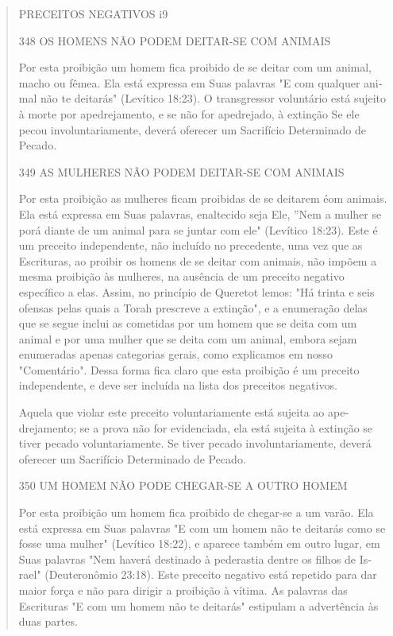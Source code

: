 \begin{quote}
PRECEITOS NEGATIVOS i9

348 OS HOMENS NÃO PODEM DEITAR-SE COM ANIMAIS

Por esta proibição um homem fica proibido de se deitar com um ani­mal,
macho ou fêmea. Ela está expressa em Suas palavras "E com qualquer
ani­mal não te deitarás" (Levítico 18:23). O transgressor voluntário
está sujeito à morte por apedrejamento, e se não for apedrejado, à
extinção Se ele pecou involuntariamente, deverá oferecer um Sacrifício
Determinado de Pecado.

349 AS MULHERES NÃO PODEM DEITAR-SE COM ANIMAIS

Por esta proibição as mulheres ficam proibidas de se deitarem éom
animais. Ela está expressa em Suas palavras, enaltecido seja Ele, ''Nem
a mulher se porá diante de um animal para se juntar com ele" (Levítico
18:23). Este é um preceito independente, não incluído no precedente, uma
vez que as Escri­turas, ao proibir os homens de se deitar com animais,
não impõem a mesma proibição às mulheres, na ausência de um preceito
negativo específico a elas. Assim, no princípio de Queretot lemos: "Há
trinta e seis ofensas pelas quais a Torah prescreve a extinção", e a
enumeração delas que se segue inclui as co­metidas por um homem que se
deita com um animal e por uma mulher que se deita com um animal, embora
sejam enumeradas apenas categorias gerais, como explicamos em nosso
"Comentário". Dessa forma fica claro que esta proi­bição é um preceito
independente, e deve ser incluída na lista dos preceitos negativos.

Aquela que violar este preceito voluntariamente está sujeita ao
ape­drejamento; se a prova não for evidenciada, ela está sujeita à
extinção se tiver pecado voluntariamente. Se tiver pecado
involuntariamente, deverá oferecer um Sacrifício Determinado de Pecado.

350 UM HOMEM NÃO PODE CHEGAR-SE A OUTRO HOMEM

Por esta proibição um homem fica proibido de chegar-se a um va­rão. Ela
está expressa em Suas palavras "E com um homem não te deitarás co­mo se
fosse uma mulher" (Levítico 18:22), e aparece também em outro lugar, em
Suas palavras "Nem haverá destinado à pederastia dentre os filhos de
Is­rael" (Deuteronômio 23:18). Este preceito negativo está repetido para
dar maior força e não para dirigir a proibição à vítima. As palavras das
Escrituras "E com um homem não te deitarás" estipulam a advertência às
duas partes.


\end{quote}
